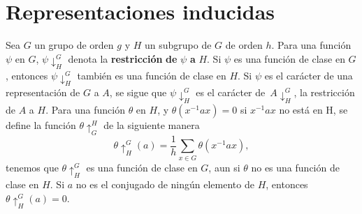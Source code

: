 \documentclass[12pt]{book}
\theoremstyle{definition}
\newcounter{in}
\begin{document}
\section{Representaciones inducidas}
\label{sec:ri}
Sea $G$ un grupo de orden $g$ y $H$ un subgrupo de $G$ de orden
$h$. Para una función $\psi$ en $G$, $\psi\downarrow^{G}_{H}$ denota
la \textbf{restricción} \textbf{de} $\psi$ \textbf{a} $H$. Si $\psi$
es una función de clase en $G$, entonces $\psi\downarrow^{G}_{H}$
también es una función de clase en $H$. Si $\psi$ es el carácter de
una representación de $G$ a $A$, se sigue que $\psi\downarrow^{G}_{H}$
es el carácter de~$A\downarrow^{G}_{H}$, la restricción de $A$ a $H$.
Para una función $\theta$ en $H$, y $\theta(x^{-1}ax)=0$ si $x^{-1}ax$
no está en H, se define la función $\theta \uparrow^{H}_{G}$ de la
siguiente manera
\begin{equation}
  \label{eq:112}
  \theta\uparrow^{G}_{H}(a)=\frac{1}{h} \sum_{x \in G} \theta(x^{-1}ax),
\end{equation}
tenemos que $\theta\uparrow^{G}_{H}$ es una función de clase en $G$,
aun si $\theta$ no es una función de clase en $H$. Si $a$ no es el
conjugado de ningún elemento de $H$,
entonces~$\theta\uparrow^{G}_{H}(a)=0$.
\end{document}
